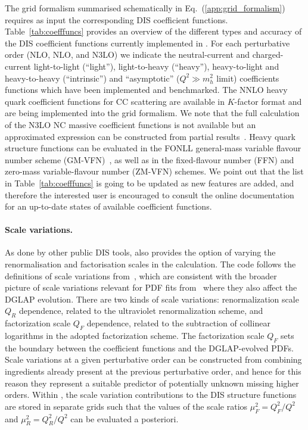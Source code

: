 The grid formalism summarised schematically in Eq.~(\ref{app:grid_formalism})
requires as input the corresponding DIS coefficient functions.
%
Table~\ref{tab:coefffuncs} provides an overview of the different types and accuracy of the DIS coefficient
functions currently implemented in \yadism.
%
For each perturbative order (NLO, NLO, and N3LO)
we indicate  the neutral-current
and charged-current light-to-light (``light''), light-to-heavy (``heavy''), heavy-to-light
and heavy-to-heavy (``intrinsic'') and ``asymptotic'' ($Q^2 \gg m_h^2$ limit)  coefficients functions
which have been implemented and benchmarked.
%
The NNLO heavy quark coefficient functions for CC scattering are available in $K$-factor format
and are being implemented into the \yadism grid formalism.
%
We note that the full calculation of the N3LO NC massive
coefficient functions is not available but an approximated expression can
be constructed from partial results~\cite{niccolo}.
%
Heavy quark structure functions can be evaluated in the FONLL
general-mass variable flavour number scheme (GM-VFN)~\cite{Forte:2010ta},
as well as in the fixed-flavour number (FFN) and zero-mass variable-flavour
number (ZM-VFN) schemes.
%
We point out that the list in Table~\ref{tab:coefffuncs} is going to be updated
as new features are added, and therefore the interested user is encouraged
to consult the online documentation for an up-to-date states
of available coefficient functions.



\paragraph{Scale variations.}
%
As done by other public DIS tools, \yadism also provides
the option of varying the renormalisation and factorisation
scales in the calculation.
%
The code follows
the definitions of scale variations from~\cite{vanNeerven:2000uj,vanNeerven:2001pe},
which are consistent with the broader picture of scale
variations relevant for PDF fits from~\cite{NNPDF:2019ubu} where they also affect the
DGLAP evolution.
%
There are two kinds of scale variations: renormalization scale $Q_R$ dependence, related to
the ultraviolet renormalization scheme, and factorization scale $Q_F$ dependence, 
related to the subtraction of collinear logarithms in the adopted factorization scheme.
%
The factorization scale $Q_F$ sets  the boundary between
the coefficient functions and the DGLAP-evolved PDFs.
%
Scale variations at a given perturbative order can be constructed from combining
ingredients already present at the previous perturbative order, and hence
for this reason they
represent a suitable predictor of potentially unknown missing higher orders.
%
Within \yadism, the scale variation contributions to the DIS structure
functions are stored in separate grids such that the values of the scale ratios
$\mu_F^2=Q_F^2/Q^2$ and $\mu_R^2=Q_R^2/Q^2$ can be evaluated a posteriori.


